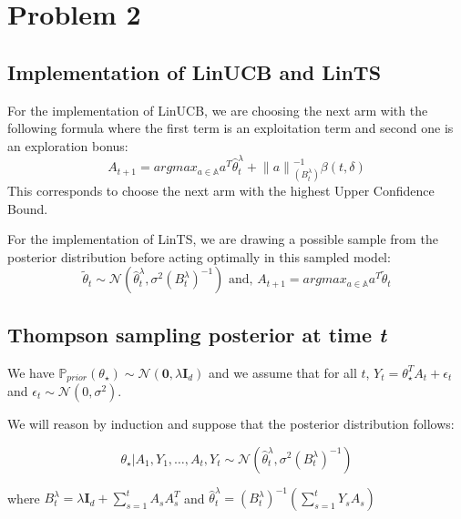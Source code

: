 \section{Problem 2}

\subsection{Implementation of \textbf{LinUCB} and \textbf{LinTS}}
For the implementation of LinUCB, we are choosing the next arm with the following formula where the first term is an exploitation term and 
second one is an exploration bonus:
\[ A_{t+1} = argmax_{a \in \mathbb{A}} a^T \hat \theta_t^{\lambda} + {\lVert a \rVert}_{(B_t^{\lambda})}^{-1} \beta(t,\delta) \]
This corresponds to choose the next arm with the highest Upper Confidence Bound.

For the implementation of LinTS, we are drawing a possible sample from the posterior distribution before acting optimally in this sampled model:
\[ \tilde{\theta}_t \sim \mathcal{N}(\hat \theta_t^{\lambda}, 
   \sigma^2{(B_t^{\lambda})}^{-1}) \text{ and, } A_{t+1} = argmax_{a \in \mathbb{A}} a^T \tilde{\theta}_t\]


\subsection{Thompson sampling posterior at time \emph{t}}
We have $\mathbb{P}_{prior}(\theta_{\star}) \sim \mathcal{N}(\mathbf{0}, \lambda \mathbf{I}_d)$ and we assume that for all $t$, $Y_{t} = \theta_{\star}^TA_t + \epsilon_t$ and $\epsilon_t \sim \mathcal{N}(0, \sigma^2)$.

We will reason by induction and suppose that the posterior distribution follows:

\[
\theta_{\star}|A_1, Y_1, \dots, A_t, Y_t \sim \mathcal{N}(\hat\theta_t^{\lambda}, \sigma^2{(B_t^{\lambda})}^{-1})
\]

where $B_t^{\lambda} = \lambda \mathbf{I}_d + \sum_{s=1}^t A_s A_s^T$ and $\hat\theta_t^{\lambda} = {(B_t^{\lambda})}^{-1} (\sum_{s=1}^t Y_s A_s)$

